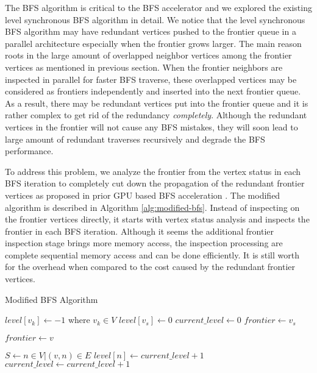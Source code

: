 The BFS algorithm is critical to the BFS accelerator and we explored the 
existing level synchronous BFS algorithm in detail. We notice that 
the level synchronous BFS algorithm may have redundant vertices pushed to the 
frontier queue in a parallel architecture especially when the frontier grows larger.
The main reason roots in the large amount of overlapped neighbor vertices among the 
frontier vertices as mentioned in previous section. When the frontier neighbors 
are inspected in parallel for faster BFS traverse, these overlapped vertices may be 
considered as frontiers independently and inserted into the next frontier queue. 
As a result, there may be redundant vertices put into the frontier queue and it is 
rather complex to get rid of the redundancy \textit{completely}. Although the redundant 
vertices in the frontier will not cause any BFS mistakes, they will soon lead to large 
amount of redundant traverses recursively and degrade the BFS performance.

To address this problem, we analyze the frontier from the 
vertex status in each BFS iteration to completely cut down the 
propagation of the redundant frontier vertices as proposed in prior 
GPU based BFS acceleration \cite{liu2015enterprise}. The modified algorithm is described 
in Algorithm \ref{alg:modified-bfs}. Instead of inspecting on the frontier vertices directly, 
it starts with vertex status analysis and inspects the frontier 
in each BFS iteration. Although it seems the additional frontier inspection stage 
brings more memory access, the inspection processing are complete sequential 
memory access and can be done efficiently. It is still worth for the overhead 
when compared to the cost caused by the redundant frontier vertices. 

\begin{algorithm}
	\caption{Modified BFS Algorithm} \label{alg:modified-bfs}
    \small
	\begin{algorithmic}[1]
		\State $level[v_k] \gets -1$ where $v_k \in V$
		\State $level[v_s] \gets 0$
		\State $current\_level \gets 0$
		\State $frontier \gets v_s$


		\State $frontier \gets v$
		\EndIf
		\EndFor

		\State $S \gets {n \in V | (v, n) \in E}$
		\State $level[n] \gets current\_level + 1$
		\EndIf
		\EndFor
		\EndFor
		\State $current\_level \gets current\_level + 1$
		\EndWhile
		\EndProcedure
	\end{algorithmic}
\end{algorithm}

